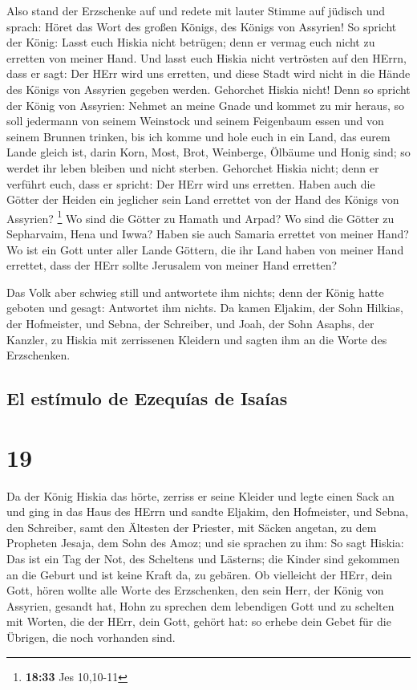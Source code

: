  Also stand der Erzschenke auf und redete mit lauter
Stimme auf jüdisch und sprach: Höret das Wort des großen Königs, des
Königs von Assyrien!  So spricht der König: Lasst euch
Hiskia nicht betrügen; denn er vermag euch nicht zu erretten von meiner
Hand.  Und lasst euch Hiskia nicht vertrösten auf den
HErrn, dass er sagt: Der HErr wird uns erretten, und diese Stadt wird
nicht in die Hände des Königs von Assyrien gegeben werden.
 Gehorchet Hiskia nicht! Denn so spricht der König von
Assyrien: Nehmet an meine Gnade und kommet zu mir heraus, so soll
jedermann von seinem Weinstock und seinem Feigenbaum essen und von
seinem Brunnen trinken,  bis ich komme und hole euch in
ein Land, das eurem Lande gleich ist, darin Korn, Most, Brot, Weinberge,
Ölbäume und Honig sind; so werdet ihr leben bleiben und nicht sterben.
Gehorchet Hiskia nicht; denn er verführt euch, dass er spricht: Der HErr
wird uns erretten.  Haben auch die Götter der Heiden ein
jeglicher sein Land errettet von der Hand des Königs von Assyrien?
\footnote{\textbf{18:33} Jes 10,10-11}  Wo sind die
Götter zu Hamath und Arpad? Wo sind die Götter zu Sepharvaim, Hena und
Iwwa? Haben sie auch Samaria errettet von meiner Hand? 
Wo ist ein Gott unter aller Lande Göttern, die ihr Land haben von meiner
Hand errettet, dass der HErr sollte Jerusalem von meiner Hand erretten?

 Das Volk aber schwieg still und antwortete ihm nichts;
denn der König hatte geboten und gesagt: Antwortet ihm nichts.
 Da kamen Eljakim, der Sohn Hilkias, der Hofmeister, und
Sebna, der Schreiber, und Joah, der Sohn Asaphs, der Kanzler, zu Hiskia
mit zerrissenen Kleidern und sagten ihm an die Worte des Erzschenken.

\hypertarget{el-estuxedmulo-de-ezequuxedas-de-isauxedas}{%
\subsection{El estímulo de Ezequías de
Isaías}\label{el-estuxedmulo-de-ezequuxedas-de-isauxedas}}

\hypertarget{section-18}{%
\section{19}\label{section-18}}

 Da der König Hiskia das hörte, zerriss er seine Kleider
und legte einen Sack an und ging in das Haus des HErrn 
und sandte Eljakim, den Hofmeister, und Sebna, den Schreiber, samt den
Ältesten der Priester, mit Säcken angetan, zu dem Propheten Jesaja, dem
Sohn des Amoz;  und sie sprachen zu ihm: So sagt Hiskia:
Das ist ein Tag der Not, des Scheltens und Lästerns; die Kinder sind
gekommen an die Geburt und ist keine Kraft da, zu gebären.
 Ob vielleicht der HErr, dein Gott, hören wollte alle
Worte des Erzschenken, den sein Herr, der König von Assyrien, gesandt
hat, Hohn zu sprechen dem lebendigen Gott und zu schelten mit Worten,
die der HErr, dein Gott, gehört hat: so erhebe dein Gebet für die
Übrigen, die noch vorhanden sind.

